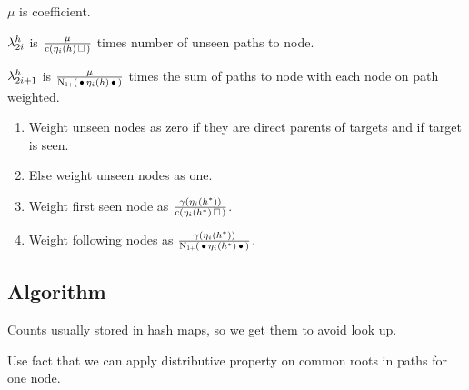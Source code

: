 \begin{draft}
$\mu$ is coefficient.
\end{draft}


\begin{draft}
$\lambda_{2 i}^h$ is $\frac{\mu}{\Count(\History_i(h) \Skp)}$ times number
of unseen paths to node.

$\lambda_{2 i + 1}^h$ is
$\frac{\mu}{\ContCountIp(\WSkp \History_i(h) \WSkp)}$ times the sum of paths to
node with each node on path weighted.
\begin{enumerate}
  \item Weight unseen nodes as zero if they are direct parents of targets and if
    target is seen.
  \item Else weight unseen nodes as one.
  \item Weight first seen node as $\frac{\gamma(\History_i(h^*))}{\Count(\History_i(h^*) \Skp)}$.
  \item Weight following nodes as $\frac{\gamma(\History_i(h^*))}{\ContCountIp(\WSkp \History_i(h^*) \WSkp)}$.
\end{enumerate}
\end{draft}


\subsection{Algorithm}

\begin{draft}
Counts usually stored in hash maps, so we get them to avoid look up.

Use fact that we can apply distributive property on common roots in paths for
one node.
\end{draft}

